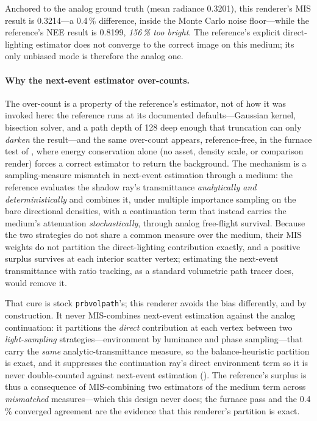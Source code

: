 Anchored to the analog ground truth (mean radiance \num{0.3201}), this renderer's MIS result is
\num{0.3214}---a \num{+0.4}\,\% difference, inside the Monte Carlo noise floor---while the reference's
NEE result is \num{0.8199}, \emph{\num{+156}\,\% too bright}. The reference's explicit direct-lighting
estimator does not converge to the correct image on this medium; its only unbiased mode is therefore
the analog one.

\paragraph{Why the next-event estimator over-counts.} The over-count is a property of the reference's
estimator, not of how it was invoked here: the reference runs at its documented defaults---Gaussian
kernel, bisection solver, and a path depth of \num{128} deep enough that truncation can only
\emph{darken} the result---and the same over-count appears, reference-free, in the furnace test of
, where energy conservation alone (no asset, density scale, or comparison render)
forces a correct estimator to return the background. The mechanism is a sampling-measure mismatch in
next-event estimation through a medium: the reference evaluates the shadow ray's transmittance
\emph{analytically and deterministically} and combines it, under multiple importance sampling on the bare
directional densities, with a continuation term that instead carries the medium's attenuation
\emph{stochastically}, through analog free-flight survival. Because the two strategies do not share a
common measure over the medium, their MIS weights do not partition the direct-lighting contribution
exactly, and a positive surplus survives at each interior scatter vertex; estimating the next-event
transmittance with ratio tracking, as a standard volumetric path tracer does, would remove it.

That cure is stock \texttt{prbvolpath}'s; this renderer avoids the bias differently, and by construction.
It never MIS-combines next-event estimation against the analog continuation: it partitions the
\emph{direct} contribution at each vertex between two \emph{light-sampling} strategies---environment by
luminance and phase sampling---that carry the \emph{same} analytic-transmittance measure, so the
balance-heuristic partition is exact, and it suppresses the continuation ray's direct environment term so
it is never double-counted against next-event estimation (). The reference's surplus
is thus a consequence of MIS-combining two estimators of the medium term across \emph{mismatched}
measures---which this design never does; the furnace pass and the \num{0.4}\,\% converged agreement are the
evidence that this renderer's partition is exact.

